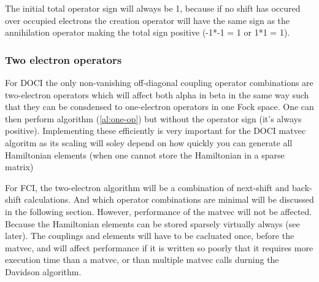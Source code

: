 The initial total operator sign will always be 1, because if no shift has occured over occupied electrons the creation operator will have the same sign as the annihilation operator making the total sign positive (-1*-1 = 1 or 1*1 = 1).

\subsubsection{Two electron operators}

For DOCI the only non-vanishing off-diagonal coupling operator combinations are two-electron operators which will affect both alpha in beta in the same way such that they can be consdensed to one-electron operators in one Fock space. One can then perform algorithm (\ref{al:one-op}) but without the operator sign (it's always positive). Implementing these efficiently is very important for the DOCI matvec algoritm as its scaling will soley depend on how quickly you can generate all Hamiltonian elements (when one cannot store the Hamiltonian in a sparse matrix)

For FCI, the two-electron algorithm will be a combination of next-shift and back-shift calculations. And which operator combinations are minimal will be discussed in the following section. However, performance of the matvec will not be affected. Because the Hamiltonian elements can be stored sparsely virtually always (see later). The couplings and elements will have to be cacluated once, before the matvec, and will affect performance if it is written so poorly that it requires more execution time than a matvec, or than multiple matvec calls durning the Davidson algorithm.
